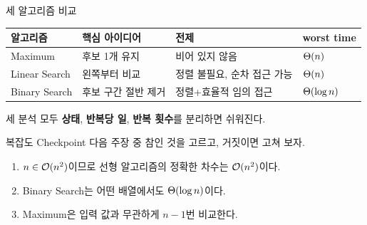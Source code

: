 \begin{frame}{세 알고리즘 비교}
  \begin{tabular}{@{}llll@{}}
    \toprule
    알고리즘 & 핵심 아이디어 & 전제 & worst time \\
    \midrule
    Maximum & 후보 1개 유지 & 비어 있지 않음 & $\Theta(n)$ \\
    Linear Search & 왼쪽부터 비교 & 정렬 불필요, 순차 접근 가능 & $\Theta(n)$ \\
    Binary Search & 후보 구간 절반 제거 & 정렬+효율적 임의 접근 & $\Theta(\log n)$ \\
    \bottomrule
  \end{tabular}
  \vfill
  세 분석 모두 \textbf{상태}, \textbf{반복당 일}, \textbf{반복 횟수}를 분리하면 쉬워진다.
\end{frame}

\begin{frame}{복잡도 Checkpoint}
  다음 주장 중 참인 것을 고르고, 거짓이면 고쳐 보자.
  \begin{enumerate}
    \item $n\in\mathcal{O}(n^2)$이므로 선형 알고리즘의 정확한 차수는 $\mathcal{O}(n^2)$이다.
    \item Binary Search는 어떤 배열에서도 $\Theta(\log n)$이다.
    \item Maximum은 입력 값과 무관하게 $n-1$번 비교한다.
  \end{enumerate}
\end{frame}
